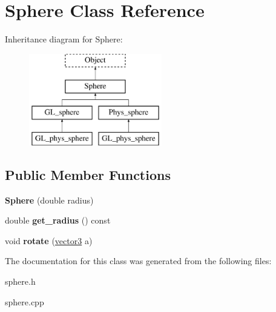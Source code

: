 \hypertarget{class_sphere}{
\section{Sphere Class Reference}
\label{class_sphere}
}
Inheritance diagram for Sphere:\begin{figure}[H]
\begin{center}
\leavevmode
\includegraphics[height=4.000000cm]{class_sphere}
\end{center}
\end{figure}
\subsection*{Public Member Functions}
\begin{DoxyCompactItemize}
\item 
\hypertarget{class_sphere_ad9e68fc78c4e2ccb78098071428155da}{
{\bfseries Sphere} (double radius)}
\label{class_sphere_ad9e68fc78c4e2ccb78098071428155da}

\item 
\hypertarget{class_sphere_abfe777cb607a5f9b19469d5e0bdf1b6d}{
double {\bfseries get\_\-radius} () const }
\label{class_sphere_abfe777cb607a5f9b19469d5e0bdf1b6d}

\item 
\hypertarget{class_sphere_a46bf9627821ba3f685b2247ee06f6fa5}{
void {\bfseries rotate} (\hyperlink{classvector3d}{vector3} a)}
\label{class_sphere_a46bf9627821ba3f685b2247ee06f6fa5}

\end{DoxyCompactItemize}


The documentation for this class was generated from the following files:\begin{DoxyCompactItemize}
\item 
sphere.h\item 
sphere.cpp\end{DoxyCompactItemize}
